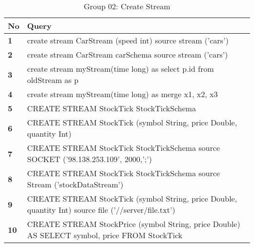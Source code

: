 \begin{table}[h]
\caption{Group 02: Create Stream}
\centering
\label{table:createStreamTest}
\setlength\extrarowheight{5pt}
\begin{tabular}{||>{\centering\bfseries}m{0.5in}|>{\centering\arraybackslash}m{5in}||}
\hline
\textbf{No} & \textbf{Query} \\ \hline\hline
     	
     1   &   create stream CarStream (speed int) source stream ('cars') \\ \hline
      2   &   create stream CarStream carSchema source stream ('cars') \\ \hline
       3  &   create stream myStream(time long) as select p.id from oldStream as p \\ \hline
       4  &   create stream myStream(time long) as merge x1, x2, x3 \\ \hline
       5  &   CREATE STREAM StockTick StockTickSchema \\ \hline
       6  &   CREATE STREAM StockTick (symbol String, price Double, quantity Int) \\ \hline
       7  &   CREATE STREAM StockTick StockTickSchema source SOCKET ('98.138.253.109', 2000,';') \\ \hline
       8  &   CREATE STREAM StockTick StockTickSchema source Stream ('stockDataStream') \\ \hline
       9  &   CREATE STREAM StockTick (symbol String, price Double, quantity Int) source file ('//server/file.txt') \\ \hline
       10  &   CREATE STREAM StockPrice (symbol String, price Double) AS SELECT symbol, price FROM StockTick\\ \hline\hline				           				
 \end{tabular}
\end{table}






